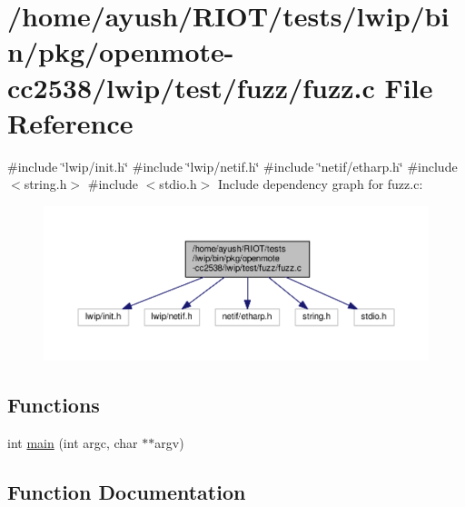 \hypertarget{openmote-cc2538_2lwip_2test_2fuzz_2fuzz_8c}{}\section{/home/ayush/\+R\+I\+O\+T/tests/lwip/bin/pkg/openmote-\/cc2538/lwip/test/fuzz/fuzz.c File Reference}
\label{openmote-cc2538_2lwip_2test_2fuzz_2fuzz_8c}
{\ttfamily \#include \char`\"{}lwip/init.\+h\char`\"{}}\newline
{\ttfamily \#include \char`\"{}lwip/netif.\+h\char`\"{}}\newline
{\ttfamily \#include \char`\"{}netif/etharp.\+h\char`\"{}}\newline
{\ttfamily \#include $<$string.\+h$>$}\newline
{\ttfamily \#include $<$stdio.\+h$>$}\newline
Include dependency graph for fuzz.\+c\+:
\nopagebreak
\begin{figure}[H]
\begin{center}
\leavevmode
\includegraphics[width=350pt]{openmote-cc2538_2lwip_2test_2fuzz_2fuzz_8c__incl}
\end{center}
\end{figure}
\subsection*{Functions}
\begin{DoxyCompactItemize}
\item 
int \hyperlink{openmote-cc2538_2lwip_2test_2fuzz_2fuzz_8c_a3c04138a5bfe5d72780bb7e82a18e627}{main} (int argc, char $\ast$$\ast$argv)
\end{DoxyCompactItemize}


\subsection{Function Documentation}
\mbox{\label{openmote-cc2538_2lwip_2test_2fuzz_2fuzz_8c_a3c04138a5bfe5d72780bb7e82a18e627}} 
